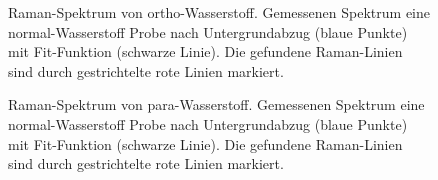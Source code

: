 \documentclass[11 pt]{article}
\begin{document}
\begin{figure}[htbp]
	\centering
   \caption{\small Raman-Spektrum von ortho-Wasserstoff. Gemessenen Spektrum eine normal-Wasserstoff Probe nach Untergrundabzug (blaue Punkte) mit Fit-Funktion (schwarze Linie). Die gefundene Raman-Linien sind durch gestrichtelte rote Linien markiert.}
   \label{fig:normal_H2}
\end{figure}

\begin{figure}[htbp]
	\centering
   \caption{\small Raman-Spektrum von para-Wasserstoff. Gemessenen Spektrum eine normal-Wasserstoff Probe nach Untergrundabzug (blaue Punkte) mit Fit-Funktion (schwarze Linie). Die gefundene Raman-Linien sind durch gestrichtelte rote Linien markiert.}
   \label{fig:para_H2}
\end{figure}
\end{document}
